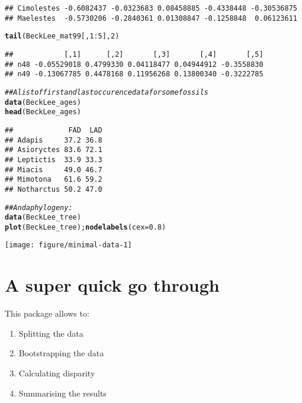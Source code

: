 \documentclass{article}\usepackage[]{graphicx}\usepackage[]{color}
\makeatletter
\newcommand{\hlnum}[1]{\textcolor[rgb]{0.686,0.059,0.569}{#1}}%
\newcommand{\hlcom}[1]{\textcolor[rgb]{0.678,0.584,0.686}{\textit{#1}}}%
\newcommand{\hlopt}[1]{\textcolor[rgb]{0,0,0}{#1}}%
\newcommand{\hlstd}[1]{\textcolor[rgb]{0.345,0.345,0.345}{#1}}%
\newcommand{\hlkwc}[1]{\textcolor[rgb]{0.333,0.667,0.333}{#1}}%
\newcommand{\hlkwd}[1]{\textcolor[rgb]{0.737,0.353,0.396}{\textbf{#1}}}%
\newenvironment{kframe}{%
 \def\at@end@of@kframe{}%
 \ifinner\ifhmode%
  \def\at@end@of@kframe{\end{minipage}}%
  \begin{minipage}{\columnwidth}%
 \fi\fi%
 \def\FrameCommand##1{\hskip\@totalleftmargin \hskip-\fboxsep
 \colorbox{shadecolor}{##1}\hskip-\fboxsep
     \hskip-\linewidth \hskip-\@totalleftmargin \hskip\columnwidth}%
 \MakeFramed {\advance\hsize-\width
   \@totalleftmargin\z@ \linewidth\hsize
   \@setminipage}}%
 {\par\unskip\endMakeFramed%
 \at@end@of@kframe}
\newenvironment{knitrout}{}{} %
\makeatother
\begin{document}
\begin{knitrout}
\begin{kframe}
\begin{verbatim}
## Cimolestes -0.6082437 -0.0323683 0.08458885 -0.4338448 -0.30536875
## Maelestes  -0.5730206 -0.2840361 0.01308847 -0.1258848  0.06123611
\end{verbatim}
\begin{alltt}
\hlkwd{tail}\hlstd{(BeckLee_mat99[,}\hlnum{1}\hlopt{:}\hlnum{5}\hlstd{],} \hlnum{2}\hlstd{)}
\end{alltt}
\begin{verbatim}
##            [,1]      [,2]       [,3]       [,4]       [,5]
## n48 -0.05529018 0.4799330 0.04118477 0.04944912 -0.3558830
## n49 -0.13067785 0.4478168 0.11956268 0.13800340 -0.3222785
\end{verbatim}
\begin{alltt}
\hlcom{## A list of first and last occurence data for some fossils}
\hlkwd{data}\hlstd{(BeckLee_ages)}
\hlkwd{head}\hlstd{(BeckLee_ages)}
\end{alltt}
\begin{verbatim}
##             FAD  LAD
## Adapis     37.2 36.8
## Asioryctes 83.6 72.1
## Leptictis  33.9 33.3
## Miacis     49.0 46.7
## Mimotona   61.6 59.2
## Notharctus 50.2 47.0
\end{verbatim}
\begin{alltt}
\hlcom{## And a phylogeny:}
\hlkwd{data}\hlstd{(BeckLee_tree)}
\hlkwd{plot}\hlstd{(BeckLee_tree) ;} \hlkwd{nodelabels}\hlstd{(}\hlkwc{cex}\hlstd{=}\hlnum{0.8}\hlstd{)}
\end{alltt}
\end{kframe}

{\centering \texttt{[image: figure/minimal-data-1]} 

}



\end{knitrout}

\section{A super quick go through}
This package allows to:
\begin{enumerate}
    \item Splitting the data
    \item Bootstrapping the data
    \item Calculating disparity
    \item Summarising the results
\end{enumerate}
\end{document}

